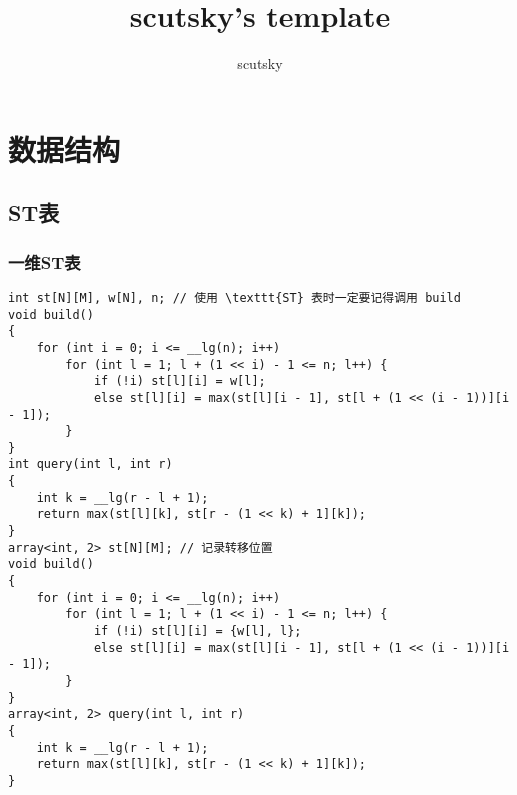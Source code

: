 \documentclass[a4paper, fontset=none]{ctexart}
\title{scutsky's template}
\author{scutsky}
\date{}
\begin{document}
\small
\begin{titlepage}
\maketitle
\end{titlepage}

\pagestyle{empty}
\renewcommand{\contentsname}{目录}
\tableofcontents %
\newpage
\pagestyle{fancy}
\setcounter{page}{1}   %

\section{数据结构}
\subsection{ST表}
\subsubsection{一维ST表}
\begin{verbatim}
int st[N][M], w[N], n; // 使用 \texttt{ST} 表时一定要记得调用 build
void build()
{
    for (int i = 0; i <= __lg(n); i++)
        for (int l = 1; l + (1 << i) - 1 <= n; l++) {
            if (!i) st[l][i] = w[l];
            else st[l][i] = max(st[l][i - 1], st[l + (1 << (i - 1))][i - 1]);
        }
}
int query(int l, int r)
{
    int k = __lg(r - l + 1);
    return max(st[l][k], st[r - (1 << k) + 1][k]);
}
array<int, 2> st[N][M]; // 记录转移位置
void build()
{
    for (int i = 0; i <= __lg(n); i++)
        for (int l = 1; l + (1 << i) - 1 <= n; l++) {
            if (!i) st[l][i] = {w[l], l};
            else st[l][i] = max(st[l][i - 1], st[l + (1 << (i - 1))][i - 1]);
        }
}
array<int, 2> query(int l, int r)
{
    int k = __lg(r - l + 1);
    return max(st[l][k], st[r - (1 << k) + 1][k]);
}
\end{verbatim}
\end{document}
